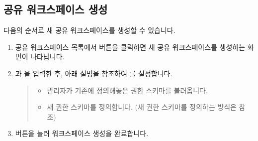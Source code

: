 \documentclass[letterpaper,10pt,english]{sphinxmanual}
\begin{document}
\subsection{공유 워크스페이스 생성}
\label{\detokenize{discovery/part03/shared_workspace:shared-workspace-creation}}\label{\detokenize{discovery/part03/shared_workspace:id3}}
다음의 순서로 새 공유 워크스페이스를 생성할 수 있습니다.
\begin{enumerate}
\def\theenumi{\arabic{enumi}}
\def\labelenumi{\theenumi .}
\makeatletter\def\p@enumii{\p@enumi \theenumi .}\makeatother
\item {} 
공유 워크스페이스 목록에서  버튼을 클릭하면 새 공유 워크스페이스를 생성하는 화면이 나타납니다.

\item {} 
과 을 입력한 후, 아래 설명을 참조하여 를 설정합니다.
\begin{quote}

\begin{figure}[H]
\centering

\noindent{}
\end{figure}
\begin{itemize}
\item {} 
 관리자가 기존에 정의해놓은 권한 스키마를 불러옵니다.

\item {} 
 새 권한 스키마를 정의합니다. (새 권한 스키마를 정의하는 방식은 {\hyperref[\detokenize{discovery/part03/shared_workspace:shared-workspace-permission}]{}} 참조)

\end{itemize}
\end{quote}

\item {} 
 버튼을 눌러 워크스페이스 생성을 완료합니다.

\end{enumerate}
\end{document}
